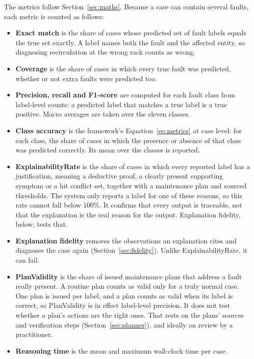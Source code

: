 The metrics follow Section~\ref{sec:maths}. Because a case can contain several faults, each metric is counted as follows:

\begin{itemize}
  \item \textbf{Exact match} is the share of cases whose predicted set of fault labels equals the true set exactly. A label names both the fault and the affected entity, so diagnosing recirculation at the wrong rack counts as wrong.
  \item \textbf{Coverage} is the share of cases in which every true fault was predicted, whether or not extra faults were predicted too.
  \item \textbf{Precision, recall and F1-score} are computed for each fault class from label-level counts: a predicted label that matches a true label is a true positive. Macro averages are taken over the eleven classes.
  \item \textbf{Class accuracy} is the framework's Equation~\eqref{eq:metrics} at case level: for each class, the share of cases in which the presence or absence of that class was predicted correctly. Its mean over the classes is reported.
  \item \textbf{ExplainabilityRate} is the share of cases in which every reported label has a justification, meaning a deductive proof, a clearly present supporting symptom or a hit conflict set, together with a maintenance plan and sourced thresholds. The system only reports a label for one of these reasons, so this rate cannot fall below 100\%. It confirms that every output is traceable, not that the explanation is the real reason for the output. Explanation fidelity, below, tests that.
  \item \textbf{Explanation fidelity} removes the observations an explanation cites and diagnoses the case again (Section~\ref{sec:fidelity}). Unlike ExplainabilityRate, it can fail.
  \item \textbf{PlanValidity} is the share of issued maintenance plans that address a fault really present. A routine plan counts as valid only for a truly normal case. One plan is issued per label, and a plan counts as valid when its label is correct, so PlanValidity is in effect label-level precision. It does not test whether a plan's actions are the right ones. That rests on the plans' sources and verification steps (Section~\ref{sec:planner}), and ideally on review by a practitioner.
  \item \textbf{Reasoning time} is the mean and maximum wall-clock time per case.
\end{itemize}

